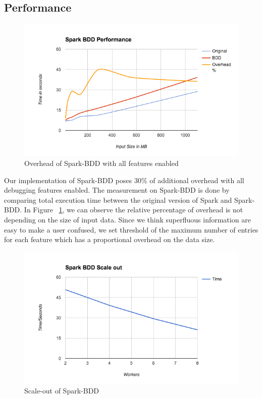 \documentclass{acm_proc_article-sp}
\begin{document}
\subsection{Performance}

\begin{figure}[ht]
    \begin{minipage}[b]{\linewidth}
        \includegraphics[width=\textwidth]{spark-bdd-performance.png}
        \caption{Overhead of Spark-BDD with all features enabled}
        \label{fig:overhead}
    \end{minipage}
\end{figure}
Our implementation of Spark-BDD poses 30\% of additional overhead with all debugging features enabled. The measurement on Spark-BDD is done by comparing total execution time between the original version of Spark and Spark-BDD. In Figure ~\ref{fig:overhead}, we can observe the relative percentage of overhead is not depending on the size of input data. Since we think superfluous information are easy to make a user confused, we set threshold of the maximum number of entries for each feature which has a proportional overhead on the data size.\\
\begin{figure}[ht]
    \begin{minipage}[b]{\linewidth}
        \includegraphics[width=\textwidth]{spark-bdd-scale-out.png}
        \caption{Scale-out of Spark-BDD}
        \label{fig:scaleout}
    \end{minipage}
\end{figure}
\end{document}
